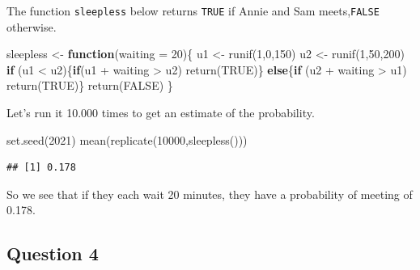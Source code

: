\documentclass[
]{book}
\newenvironment{Shaded}{\begin{snugshade}}{\end{snugshade}}
\newcommand{\AttributeTok}[1]{\textcolor[rgb]{0.77,0.63,0.00}{#1}}
\newcommand{\ConstantTok}[1]{\textcolor[rgb]{0.00,0.00,0.00}{#1}}
\newcommand{\ControlFlowTok}[1]{\textcolor[rgb]{0.13,0.29,0.53}{\textbf{#1}}}
\newcommand{\DecValTok}[1]{\textcolor[rgb]{0.00,0.00,0.81}{#1}}
\newcommand{\FunctionTok}[1]{\textcolor[rgb]{0.00,0.00,0.00}{#1}}
\newcommand{\NormalTok}[1]{#1}
\newcommand{\OtherTok}[1]{\textcolor[rgb]{0.56,0.35,0.01}{#1}}
\newcommand{\SpecialCharTok}[1]{\textcolor[rgb]{0.00,0.00,0.00}{#1}}
\begin{document}
The function \texttt{sleepless} below returns \texttt{TRUE} if Annie and Sam meets,\texttt{FALSE} otherwise.

\begin{Shaded}
\begin{Highlighting}[]
\NormalTok{sleepless }\OtherTok{\textless{}{-}} \ControlFlowTok{function}\NormalTok{(}\AttributeTok{waiting =} \DecValTok{20}\NormalTok{)\{}
\NormalTok{  u1 }\OtherTok{\textless{}{-}} \FunctionTok{runif}\NormalTok{(}\DecValTok{1}\NormalTok{,}\DecValTok{0}\NormalTok{,}\DecValTok{150}\NormalTok{)}
\NormalTok{  u2 }\OtherTok{\textless{}{-}} \FunctionTok{runif}\NormalTok{(}\DecValTok{1}\NormalTok{,}\DecValTok{50}\NormalTok{,}\DecValTok{200}\NormalTok{)}
  \ControlFlowTok{if}\NormalTok{ (u1 }\SpecialCharTok{\textless{}}\NormalTok{ u2)\{}\ControlFlowTok{if}\NormalTok{(u1 }\SpecialCharTok{+}\NormalTok{ waiting }\SpecialCharTok{\textgreater{}}\NormalTok{ u2) }\FunctionTok{return}\NormalTok{(}\ConstantTok{TRUE}\NormalTok{)\}}
  \ControlFlowTok{else}\NormalTok{\{}\ControlFlowTok{if}\NormalTok{ (u2 }\SpecialCharTok{+}\NormalTok{ waiting }\SpecialCharTok{\textgreater{}}\NormalTok{ u1) }\FunctionTok{return}\NormalTok{(}\ConstantTok{TRUE}\NormalTok{)\}}
  \FunctionTok{return}\NormalTok{(}\ConstantTok{FALSE}\NormalTok{)}
\NormalTok{\}}
\end{Highlighting}
\end{Shaded}

Let's run it 10.000 times to get an estimate of the probability.

\begin{Shaded}
\begin{Highlighting}[]
\FunctionTok{set.seed}\NormalTok{(}\DecValTok{2021}\NormalTok{)}
\FunctionTok{mean}\NormalTok{(}\FunctionTok{replicate}\NormalTok{(}\DecValTok{10000}\NormalTok{,}\FunctionTok{sleepless}\NormalTok{()))}
\end{Highlighting}
\end{Shaded}

\begin{verbatim}
## [1] 0.178
\end{verbatim}

So we see that if they each wait 20 minutes, they have a probability of meeting of 0.178.

\hypertarget{question-4}{%
\subsection{Question 4}\label{question-4}}
\end{document}
